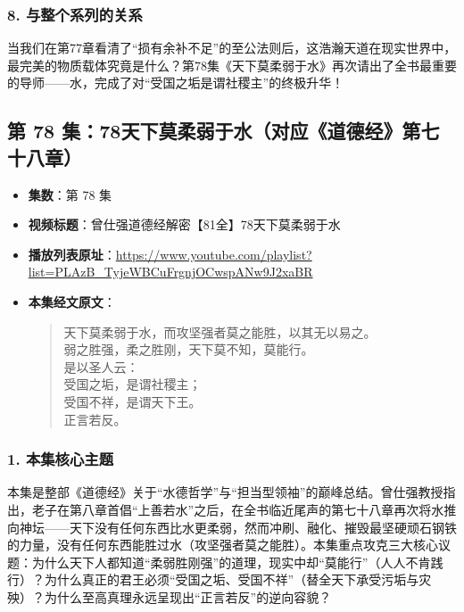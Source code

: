 \subsubsection{8. 与整个系列的关系}
当我们在第77章看清了“损有余补不足”的至公法则后，这浩瀚天道在现实世界中，最完美的物质载体究竟是什么？第78集《天下莫柔弱于水》再次请出了全书最重要的导师——水，完成了对“受国之垢是谓社稷主”的终极升华！

\clearpage

\subsection{第 78 集：78天下莫柔弱于水（对应《道德经》第七十八章）}
\label{sec:ep78}

\begin{itemize}
    \item \textbf{集数}：第 78 集
    \item \textbf{视频标题}：曾仕强道德经解密【81全】78天下莫柔弱于水
    \item \textbf{播放列表原址}：\url{https://www.youtube.com/playlist?list=PLAzB_TyjeWBCuFrgnjOCwspANw9J2xaBR}
    \item \textbf{本集经文原文}：
    \begin{quote}\kaishu
    天下莫柔弱于水，而攻坚强者莫之能胜，以其无以易之。\\
    弱之胜强，柔之胜刚，天下莫不知，莫能行。\\
    是以圣人云：\\
    受国之垢，是谓社稷主；\\
    受国不祥，是谓天下王。\\
    正言若反。
    \end{quote}
\end{itemize}

\subsubsection{1. 本集核心主题}
本集是整部《道德经》关于“水德哲学”与“担当型领袖”的巅峰总结。曾仕强教授指出，老子在第八章首倡“上善若水”之后，在全书临近尾声的第七十八章再次将水推向神坛——天下没有任何东西比水更柔弱，然而冲刷、融化、摧毁最坚硬顽石钢铁的力量，没有任何东西能胜过水（攻坚强者莫之能胜）。本集重点攻克三大核心议题：为什么天下人都知道“柔弱胜刚强”的道理，现实中却“莫能行”（人人不肯践行）？为什么真正的君王必须“受国之垢、受国不祥”（替全天下承受污垢与灾殃）？为什么至高真理永远呈现出“正言若反”的逆向容貌？

